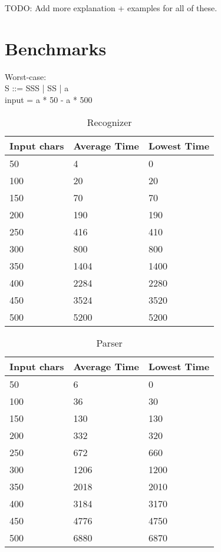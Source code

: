 \documentclass[a4paper,10pt]{article}
\begin{document}
TODO: Add more explanation + examples for all of these.\\


\section{Benchmarks}

Worst-case:\\
S ::= SSS | SS | a\\
input = a * 50 - a * 500\\

\begin{table}
\centering
\begin{tabular}{ | p{5em} | p{7em} | p{6em} | }
  \hline
  Input chars & Average Time & Lowest Time \\
  \hline
  50 & 4 & 0 \\
  100 & 20 & 20 \\
  150 & 70 & 70 \\
  200 & 190 & 190 \\
  250 & 416 & 410 \\
  300 & 800 & 800 \\
  350 & 1404 & 1400 \\
  400 & 2284 & 2280 \\
  450 & 3524 & 3520 \\
  500 & 5200 & 5200 \\
  \hline
\end{tabular}
\caption{Recognizer}
\end{table}

\begin{table}
\centering
\begin{tabular}{ | p{5em} | p{7em} | p{6em} | }
  \hline
  Input chars & Average Time & Lowest Time \\
  \hline
  50 & 6 & 0 \\
  100 & 36 & 30 \\
  150 & 130 & 130 \\
  200 & 332 & 320 \\
  250 & 672 & 660 \\
  300 & 1206 & 1200 \\
  350 & 2018 & 2010 \\
  400 & 3184 & 3170 \\
  450 & 4776 & 4750 \\
  500 & 6880 & 6870 \\
  \hline
\end{tabular}
\caption{Parser}
\end{table}
\end{document}
